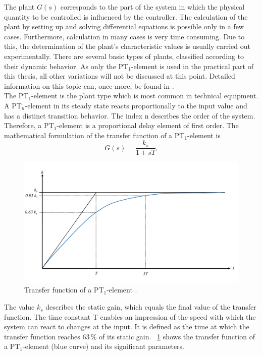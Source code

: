 The plant $G(s)$ corresponds to the part of the system in which the physical quantity to be controlled is influenced by the controller. The calculation of the plant by setting up and solving differential equations is possible only in a few cases. Furthermore, calculation in many cases is very time consuming. Due to this, the determination of the plant's characteristic values is usually carried out experimentally. There are several basic types of plants, classified according to their dynamic behavior. As only the PT$_{1}$-element is used in the practical part of this thesis, all other variations will not be discussed at this point. Detailed information on this topic can, once more, be found in \cite{Reg_10}.
\\The PT$_{1}$-element is the plant type which is most common in technical equipment. A PT$_{n}$-element in its steady state reacts proportionally to the input value and has a distinct transition behavior. The index n describes the order of the system. Therefore, a PT$_{1}$-element is a proportional delay element of first order. The mathematical formulation of the transfer function of a PT$_{1}$-element is
\begin{equation}
    G(s) = \frac{k_{s}}{1+sT}.
 \label{eq:tf_pt1}
\end{equation}

\begin{figure}[h]
   \centering
   \includegraphics[width=\textwidth]{images/tf_pt1.pdf}
   \caption[Transfer function of a PT$_{1}$-element]{Transfer function of a PT$_{1}$-element \cite{Reg_10}.}
   \label{fig:tf_pt1}
 \end{figure}
The value $k_{s}$ describes the static gain, which equals the final value of the transfer function. The time constant T enables an impression of the speed with which the system can react to changes at the input. It is defined as the time at which the transfer function reaches $63\, \%$ of its static gain. \cite{Reg_10}
\figurename~\ref{fig:tf_pt1} shows the transfer function of a PT$_{1}$-element (blue curve) and its significant parameters.


